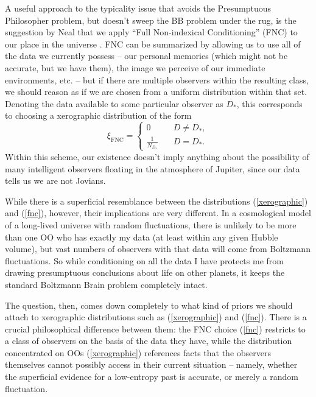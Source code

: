 \documentclass[12pt,letterpaper]{article}
\newcommand{\be}{\begin{equation}}
\newcommand{\ee}{\end{equation}}
\begin{document}
A useful approach to the typicality issue that avoids the Presumptuous Philosopher problem, but doesn't sweep the BB problem under the rug, is the suggestion by Neal that we apply ``Full Non-indexical Conditioning'' (FNC) to our place in the universe \cite{Neal:2006py}.
FNC can be summarized by allowing us to use all of the data we currently possess -- our personal memories (which might not be accurate, but we have them), the image we perceive of our immediate environments, etc. -- but if there are multiple observers within the resulting class, we should reason as if we are chosen from a uniform distribution within that set.
Denoting the data available to some particular observer as $D_*$, this corresponds to choosing a xerographic distribution of the form
\be
  \xi_\mathrm{FNC} = 
    \begin{cases}
  0& \quad D\neq D_*, \\ 
  \frac{1}{N_{D_*}} &\quad D = D_*.
  \end{cases}
  \label{fnc}
\ee
Within this scheme, our existence doesn't imply anything about the possibility of many intelligent observers floating in the atmosphere of Jupiter, since our data tells us we are not Jovians.

While there is a superficial resemblance between the distributions (\ref{xerographic}) and (\ref{fnc}), however, their implications are very different. 
In a cosmological model of a long-lived universe with random fluctuations, there is unlikely to be more than one OO who has exactly my data (at least within any given Hubble volume), but vast numbers of observers with that data will come from Boltzmann fluctuations.
So while conditioning on all the data I have protects me from drawing presumptuous conclusions about life on other planets, it keeps the standard Boltzmann Brain problem completely intact.

The question, then, comes down completely to what kind of priors we should attach to xerographic distributions such as (\ref{xerographic}) and (\ref{fnc}).
There is a crucial philosophical difference between them: the FNC choice (\ref{fnc}) restricts to a class of observers on the basis of the data they have, while the distribution concentrated on OOs (\ref{xerographic}) references facts that the observers themselves cannot possibly access in their current situation -- namely, whether the superficial evidence for a low-entropy past is accurate, or merely a random fluctuation.
\end{document}
